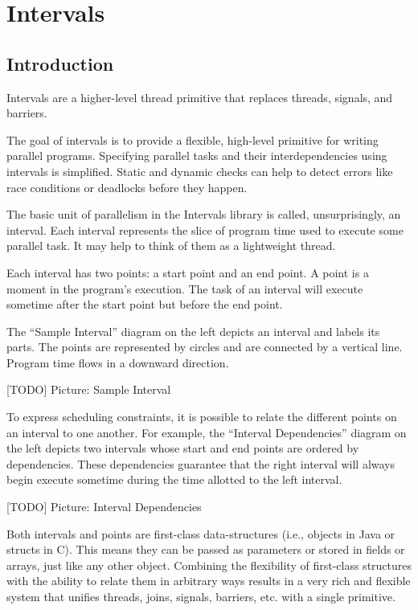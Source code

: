 
\chapter{Intervals}
\label{cha:intervals}

\section{Introduction}
\label{sec:intervals-introduction}

Intervals are a higher-level thread primitive that replaces threads,
signals, and barriers.

The goal of intervals is to provide a flexible, high-level primitive
for writing parallel programs. Specifying parallel tasks and their
interdependencies using intervals is simplified. Static and dynamic
checks can help to detect errors like race conditions or deadlocks
before they happen.

The basic unit of parallelism in the Intervals library is called,
unsurprisingly, an interval. Each interval represents the slice of
program time used to execute some parallel task. It may help to think
of them as a lightweight thread.

Each interval has two points: a start point and an end point. A point
is a moment in the program's execution. The task of an interval will
execute sometime after the start point but before the end point.

The ``Sample Interval'' diagram on the left depicts an interval and
labels its parts. The points are represented by circles and are
connected by a vertical line. Program time flows in a downward
direction.

[TODO] Picture: Sample Interval

To express scheduling constraints, it is possible to relate the
different points on an interval to one another. For example, the
``Interval Dependencies'' diagram on the left depicts two intervals
whose start and end points are ordered by dependencies. These
dependencies guarantee that the right interval will always begin
execute sometime during the time allotted to the left interval.

[TODO] Picture: Interval Dependencies

Both intervals and points are first-class data-structures (i.e.,
objects in Java or structs in C). This means they can be passed as
parameters or stored in fields or arrays, just like any other object.
Combining the flexibility of first-class structures with the ability
to relate them in arbitrary ways results in a very rich and flexible
system that unifies threads, joins, signals, barriers, etc. with a
single primitive.

